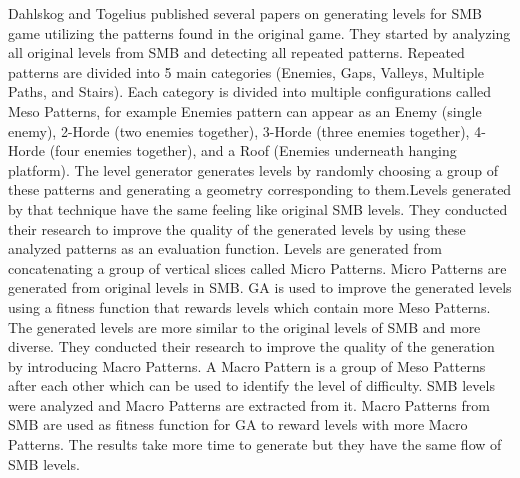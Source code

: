 Dahlskog and Togelius\cite{superMarioPattern1, superMarioPattern2, superMarioPattern3, superMarioPattern4} published several papers on generating levels for SMB game utilizing the patterns found in the original game. They started\cite{superMarioPattern1} by analyzing all original levels from SMB and detecting all repeated patterns. Repeated patterns are divided into 5 main categories (Enemies, Gaps, Valleys, Multiple Paths, and Stairs). Each category is divided into multiple configurations called Meso Patterns, for example Enemies pattern can appear as an Enemy (single enemy), 2-Horde (two enemies together), 3-Horde (three enemies together), 4-Horde (four enemies together), and a Roof (Enemies underneath hanging platform). The level generator generates levels by randomly choosing a group of these patterns and generating a geometry corresponding to them.Levels generated by that technique have the same feeling like original SMB levels. They conducted their research\cite{superMarioPattern2, superMarioPattern3} to improve the quality of the generated levels by using these analyzed patterns as an evaluation function. Levels are generated from concatenating a group of vertical slices called Micro Patterns. Micro Patterns are generated from original levels in SMB. GA is used to improve the generated levels using a fitness function that rewards levels which contain more Meso Patterns. The generated levels are more similar to the original levels of SMB and more diverse. They conducted their research\cite{superMarioPattern4} to improve the quality of the generation by introducing Macro Patterns. A Macro Pattern is a group of Meso Patterns after each other which can be used to identify the level of difficulty. SMB levels were analyzed and Macro Patterns are extracted from it. Macro Patterns from SMB are used as fitness function for GA to reward levels with more Macro Patterns. The results take more time to generate but they have the same flow of SMB levels.\\\par


